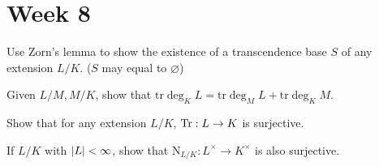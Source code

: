 
\section{Week 8}

\begin{exercise} 
  Use Zorn's lemma to show the existence of a transcendence base $S$ of any 
  extension $L/K$. ($S$ may equal to $\varnothing$)
\end{exercise}

\begin{exercise}
  Given $L/M, M/K$, show that $\mathrm{tr} \deg_K L = \mathrm{tr} \deg_M L
  + \mathrm{tr} \deg_K M$.
\end{exercise}

\begin{exercise}
  Show that for any extension $L/K$, $\operatorname{Tr} : L \to K$ is surjective.
\end{exercise}

\begin{exercise}
  If $L/K$ with $\lvert L\rvert < \infty$, show that $\mathrm{N}_{L/K} : L^\times \to K^\times$
  is also surjective.
\end{exercise}
